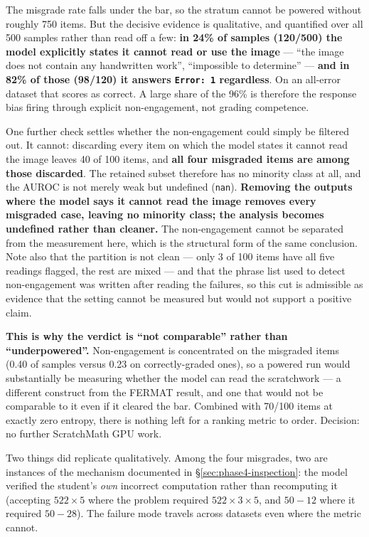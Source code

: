 \documentclass[11pt]{article}
\begin{document}
The misgrade rate falls under the bar, so the stratum cannot be powered
without roughly 750 items. But the decisive evidence is qualitative, and
quantified over all 500 samples rather than read off a few: \textbf{in
24\% of samples (120/500) the model explicitly states it cannot read or
use the image} --- ``the image does not contain any handwritten work'',
``impossible to determine'' --- \textbf{and in 82\% of those (98/120) it
answers \texttt{Error: 1} regardless}. On an all-error dataset that scores
as correct. A large share of the 96\% is therefore the response bias
firing through explicit non-engagement, not grading competence.

One further check settles whether the non-engagement could simply be
filtered out. It cannot: discarding every item on which the model states it
cannot read the image leaves 40 of 100 items, and \textbf{all four
misgraded items are among those discarded}. The retained subset therefore
has no minority class at all, and the AUROC is not merely weak but
undefined (\texttt{nan}). \textbf{Removing the outputs where the model says
it cannot read the image removes every misgraded case, leaving no minority
class; the analysis becomes undefined rather than cleaner.} The
non-engagement cannot be separated from the measurement here, which is the
structural form of the same conclusion. Note also that the partition is not
clean --- only 3 of 100 items have all five readings flagged, the rest are
mixed --- and that the phrase list used to detect non-engagement was written
after reading the failures, so this cut is admissible as evidence that the
setting cannot be measured but would not support a positive claim.

\textbf{This is why the verdict is ``not comparable'' rather than
``underpowered''.} Non-engagement is concentrated on the misgraded items
(0.40 of samples versus 0.23 on correctly-graded ones), so a powered run
would substantially be measuring whether the model can read the
scratchwork --- a different construct from the FERMAT result, and one that
would not be comparable to it even if it cleared the bar. Combined with
70/100 items at exactly zero entropy, there is nothing left for a ranking
metric to order. Decision: no further ScratchMath GPU work.

Two things did replicate qualitatively. Among the four misgrades, two are
instances of the mechanism documented in \S\ref{sec:phase4-inspection}:
the model verified the student's \emph{own} incorrect computation rather
than recomputing it (accepting $522 \times 5$ where the problem required
$522 \times 3 \times 5$, and $50 - 12$ where it required $50 - 28$). The
failure mode travels across datasets even where the metric cannot.
\end{document}
